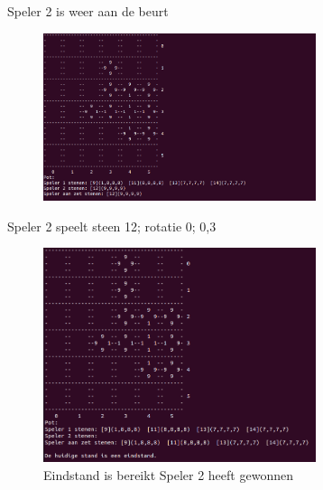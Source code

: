 \documentclass{article}
\begin{document}
\newpage
Speler 2 is weer aan de beurt
\begin{figure}[htp]
    \centering
    \includegraphics[width=8cm]{algo1/imgs/six.png}
    \label{fig:galaxy}
\end{figure}
\newpage
Speler 2 speelt steen 12; rotatie 0; 0,3
\begin{figure}[htp]
    \centering
    \includegraphics[width=8cm]{algo1/imgs/seven.png}
    \caption{Eindstand is bereikt Speler 2 heeft gewonnen}
    \label{fig:galaxy}
\end{figure}
\newpage 
\end{document}

